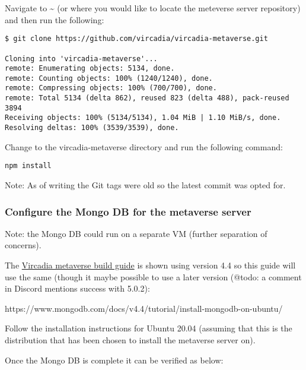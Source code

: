 Navigate to \textasciitilde{} (or where you would like to locate the
meteverse server repository) and then run the following:

\begin{verbatim}
$ git clone https://github.com/vircadia/vircadia-metaverse.git

Cloning into 'vircadia-metaverse'...
remote: Enumerating objects: 5134, done.
remote: Counting objects: 100% (1240/1240), done.
remote: Compressing objects: 100% (700/700), done.
remote: Total 5134 (delta 862), reused 823 (delta 488), pack-reused 3894
Receiving objects: 100% (5134/5134), 1.04 MiB | 1.10 MiB/s, done.
Resolving deltas: 100% (3539/3539), done.
\end{verbatim}

Change to the vircadia-metaverse directory and run the following
command:

\begin{verbatim}
npm install
\end{verbatim}

Note: As of writing the Git tags were old so the latest commit was opted
for.

\hypertarget{configure-the-mongo-db-for-the-metaverse-server}{%
\subsubsection{Configure the Mongo DB for the metaverse
server}\label{configure-the-mongo-db-for-the-metaverse-server}}

Note: the Mongo DB could run on a separate VM (further separation of
concerns).

The
\href{https://github.com/vircadia/vircadia-metaverse/blob/master/docs/Building.md}{Vircadia
metaverse build guide} is shown using version 4.4 so this guide will use
the same (though it maybe possible to use a later version (@todo: a
comment in Discord mentions success with 5.0.2):

https://www.mongodb.com/docs/v4.4/tutorial/install-mongodb-on-ubuntu/

Follow the installation instructions for Ubuntu 20.04 (assuming that
this is the distribution that has been chosen to install the metaverse
server on).

Once the Mongo DB is complete it can be verified as below:

